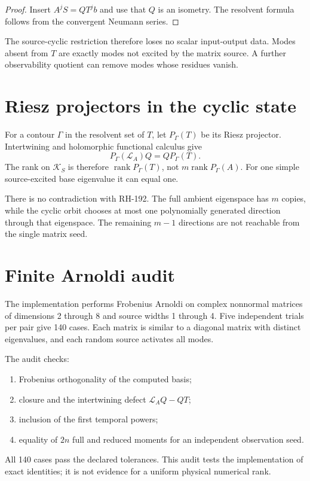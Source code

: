 \documentclass[12pt]{article}
\theoremstyle{remark}
\newcommand{\cK}{\mathcal K}
\newcommand{\cL}{\mathcal L}
\newcommand{\rank}{\operatorname{rank}}
\begin{document}
\begin{proof}
Insert $A^jS=QT^jb$ and use that $Q$ is an isometry.  The resolvent formula
follows from the convergent Neumann series.
\end{proof}

The source-cyclic restriction therefore loses no scalar input-output data.
Modes absent from $T$ are exactly modes not excited by the matrix source.
A further observability quotient can remove modes whose residues vanish.

\section{Riesz projectors in the cyclic state}

For a contour $\Gamma$ in the resolvent set of $T$, let
$P_\Gamma(T)$ be its Riesz projector.  Intertwining and holomorphic
functional calculus give
\begin{equation}\label{eq:riesz-intertwining}
 P_\Gamma(\cL_A)Q=QP_\Gamma(T).
\end{equation}
The rank on $\cK_S$ is therefore
$\rank P_\Gamma(T)$, not $m\rank P_\Gamma(A)$.  For one simple
source-excited base eigenvalue it can equal one.

There is no contradiction with RH-192.  The full ambient eigenspace has $m$
copies, while the cyclic orbit chooses at most one polynomially generated
direction through that eigenspace.  The remaining $m-1$ directions are not
reachable from the single matrix seed.

\section{Finite Arnoldi audit}

The implementation performs Frobenius Arnoldi on complex nonnormal matrices
of dimensions 2 through 8 and source widths 1 through 4.  Five independent
trials per pair give 140 cases.  Each matrix is similar to a diagonal matrix
with distinct eigenvalues, and each random source activates all modes.

The audit checks:
\begin{enumerate}[leftmargin=2em]
\item Frobenius orthogonality of the computed basis;
\item closure and the intertwining defect $\cL_AQ-QT$;
\item inclusion of the first temporal powers;
\item equality of $2n$ full and reduced moments for an independent
 observation seed.
\end{enumerate}
All 140 cases pass the declared tolerances.  This audit tests the
implementation of exact identities; it is not evidence for a uniform
physical numerical rank.
\end{document}
